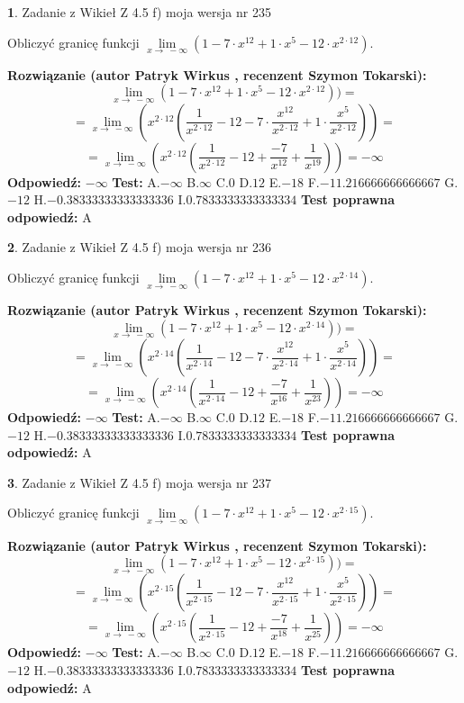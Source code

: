 \documentclass[12pt, a4paper]{article}
\theoremstyle{definition} %
\newtheorem{zad}{}
\newcommand{\zadStart}[1]{\begin{zad}#1\newline}
\newcommand{\zadStop}{\end{zad}}
\newcommand{\rozwStart}[2]{\noindent \textbf{Rozwiązanie (autor #1 , recenzent #2): }\newline}
\newcommand{\rozwStop}{\newline}
\newcommand{\odpStart}{\noindent \textbf{Odpowiedź:}\newline}
\newcommand{\odpStop}{\newline}
\newcommand{\testStart}{\noindent \textbf{Test:}\newline}
\newcommand{\testStop}{\newline}
\newcommand{\kluczStart}{\noindent \textbf{Test poprawna odpowiedź:}\newline}
\newcommand{\kluczStop}{\newline}
\begin{document}
\zadStart{Zadanie z Wikieł Z 4.5 f) moja wersja nr 235}


Obliczyć granicę funkcji  $\lim\limits_{x\to\ -\infty}(1 - 7 \cdot x^{12}+1 \cdot x^{5}- 12 \cdot x^{2\cdot12})$.
\zadStop
\rozwStart{Patryk Wirkus}{Szymon Tokarski}
$$\lim\limits_{x\to\ -\infty}(1 - 7 \cdot x^{12}+1 \cdot x^{5}- 12 \cdot x^{2\cdot12}))=$$
$$=\lim\limits_{x\to\ -\infty}(x^{2\cdot12}(\frac{1}{x^{2\cdot12}}-12 -7 \cdot \frac{x^{12}}{x^{2\cdot12}}+1 \cdot \frac{x^{5}}{x^{2\cdot12}}))=$$
$$=\lim\limits_{x\to\ -\infty}(x^{2\cdot12}(\frac{1}{x^{2\cdot12}}-12 + \frac{-7}{x^{12}}+ \frac{1}{x^{19}}))=-\infty$$
\rozwStop
\odpStart
$-\infty$
\odpStop
\testStart
A.$-\infty$ B.$\infty$ C.$0$ D.$12$ E.$-18$
F.$-11.216666666666667$ G.$-12$
H.$-0.38333333333333336$
I.$0.7833333333333334$
\testStop
\kluczStart
A
\kluczStop



\zadStart{Zadanie z Wikieł Z 4.5 f) moja wersja nr 236}


Obliczyć granicę funkcji  $\lim\limits_{x\to\ -\infty}(1 - 7 \cdot x^{12}+1 \cdot x^{5}- 12 \cdot x^{2\cdot14})$.
\zadStop
\rozwStart{Patryk Wirkus}{Szymon Tokarski}
$$\lim\limits_{x\to\ -\infty}(1 - 7 \cdot x^{12}+1 \cdot x^{5}- 12 \cdot x^{2\cdot14}))=$$
$$=\lim\limits_{x\to\ -\infty}(x^{2\cdot14}(\frac{1}{x^{2\cdot14}}-12 -7 \cdot \frac{x^{12}}{x^{2\cdot14}}+1 \cdot \frac{x^{5}}{x^{2\cdot14}}))=$$
$$=\lim\limits_{x\to\ -\infty}(x^{2\cdot14}(\frac{1}{x^{2\cdot14}}-12 + \frac{-7}{x^{16}}+ \frac{1}{x^{23}}))=-\infty$$
\rozwStop
\odpStart
$-\infty$
\odpStop
\testStart
A.$-\infty$ B.$\infty$ C.$0$ D.$12$ E.$-18$
F.$-11.216666666666667$ G.$-12$
H.$-0.38333333333333336$
I.$0.7833333333333334$
\testStop
\kluczStart
A
\kluczStop



\zadStart{Zadanie z Wikieł Z 4.5 f) moja wersja nr 237}


Obliczyć granicę funkcji  $\lim\limits_{x\to\ -\infty}(1 - 7 \cdot x^{12}+1 \cdot x^{5}- 12 \cdot x^{2\cdot15})$.
\zadStop
\rozwStart{Patryk Wirkus}{Szymon Tokarski}
$$\lim\limits_{x\to\ -\infty}(1 - 7 \cdot x^{12}+1 \cdot x^{5}- 12 \cdot x^{2\cdot15}))=$$
$$=\lim\limits_{x\to\ -\infty}(x^{2\cdot15}(\frac{1}{x^{2\cdot15}}-12 -7 \cdot \frac{x^{12}}{x^{2\cdot15}}+1 \cdot \frac{x^{5}}{x^{2\cdot15}}))=$$
$$=\lim\limits_{x\to\ -\infty}(x^{2\cdot15}(\frac{1}{x^{2\cdot15}}-12 + \frac{-7}{x^{18}}+ \frac{1}{x^{25}}))=-\infty$$
\rozwStop
\odpStart
$-\infty$
\odpStop
\testStart
A.$-\infty$ B.$\infty$ C.$0$ D.$12$ E.$-18$
F.$-11.216666666666667$ G.$-12$
H.$-0.38333333333333336$
I.$0.7833333333333334$
\testStop
\kluczStart
A
\kluczStop
\end{document}
